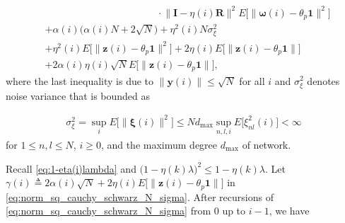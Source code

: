 \documentclass[journal]{IEEEtran}
\begin{document}
\begin{align}
&\,\,\,\,\,\,\,\,\,\,\,\,\,\,\,\,\,\,\,\,\,\,\,\,\,\,\,\,\,\,\,\,\,\,\,\,\,\,\,\,\,\,\,\,\,\,\,\,\,\,\,\,\,\,\,\,\,\,\,\,\,\,\,\,\,\,\,\,\cdot\Big\|\mathbf{I} - \eta(i)\mathbf{R}\Big\|^2   E\Big[\big\|\bm{\omega}(i)-\theta_p\mathbf{1}\big\|^2\Big] \nonumber \\
&+\alpha(i) \Big(\alpha(i)N + 2\sqrt{N}\Big) + \eta^2(i)N\sigma_\xi^2 \nonumber \\
& + \eta^2(i)E\Big[\big\|\mathbf{z}(i) - \theta_p\mathbf{1}\big\|^2\Big] + 2\eta(i) E\Big[\big\|\mathbf{z}(i)- {\theta_p}\mathbf{1}\big\| \Big] \nonumber \\
&+ 2\alpha(i)\eta(i)\sqrt{N} E\Big[ \big\|\mathbf{z}(i)- {\theta_p}\mathbf{1} \big\| \Big], \label{eq:norm_sq_cauchy_schwarz_N_sigma}
\end{align}
\normalsize
where {}{the last inequality is due to $\big\|\mathbf{y}(i)\big\| \le \sqrt{N}$ for all $i$ and $\sigma_\xi^2$ denotes noise variance that is bounded as}

\vspace{-4mm}
\small  {}{
\begin{align}
\sigma_\xi^2 = \sup_i E\Big[\big\|\bm{\xi}(i)\big\|^2\Big] \le N d_{\text{max}} \sup_{n,l,i} E \Big[\xi_{nl}^2(i)\Big] < \infty
\end{align}
\normalsize
for $1 \le n,l \le N$, $i \ge 0$, and the maximum degree $d_{\text{max}}$ of network.}

Recall \eqref{eq:1-eta(i)lambda} and $\big(1-\eta(k)\lambda\big)^2 \le 1-\eta(k)\lambda$. Let $\gamma(i) \triangleq 2\alpha(i)\sqrt{N} + 2\eta(i) E\Big[\big\|\mathbf{z}(i) - \theta_p \mathbf{1}\big\|\Big]$ in \eqref{eq:norm_sq_cauchy_schwarz_N_sigma}. After recursions of \eqref{eq:norm_sq_cauchy_schwarz_N_sigma} from 0 up to $i-1$, we have 
\end{document}
